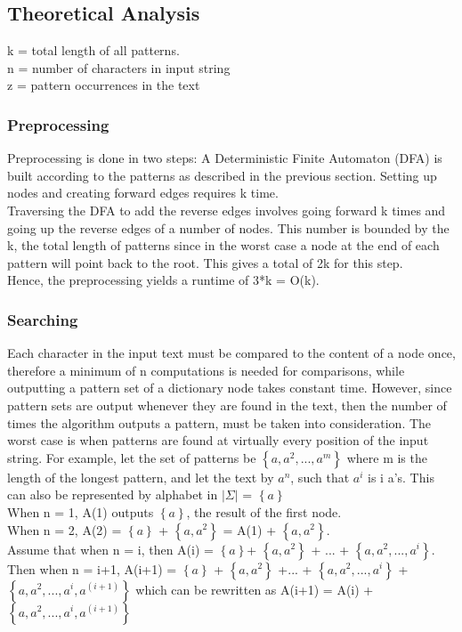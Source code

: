 \documentclass[paper=a4, fontsize=11pt]{scrartcl} %
\numberwithin{equation}{section} %
\numberwithin{figure}{section} %
\numberwithin{table}{section} %
\begin{document}
\subsection{Theoretical Analysis}
k = total length of all patterns.\\
n = number of characters in input string\\
z = pattern occurrences in the text

\subsubsection{Preprocessing}
Preprocessing is done in two steps:
A Deterministic Finite Automaton (DFA) is built according to the patterns as described in the previous section. Setting up nodes and creating forward edges requires k time.\\
Traversing the DFA to add the reverse edges involves going forward k times and going up the reverse edges of a number of nodes. This number is bounded by the k, the total length of patterns since in the worst case a node at the end of each pattern will point back to the root. This gives a total of 2k for this step. \\
Hence, the preprocessing yields a runtime of 3*k = O(k). 

\subsubsection{Searching}
Each character in the input text must be compared to the content of a node once, therefore a minimum of n computations is needed for comparisons, while outputting a pattern set of a dictionary node takes constant time. However, since pattern sets are output whenever they are found in the text, then the number of times the algorithm outputs a pattern, must be taken into consideration. The worst case is when patterns are found at virtually every position of the input string. For example, let the set of patterns be $\left\{a, a^2, ..., a^m\right\}$ where m is the length of the longest pattern, and let the text by $a^n$, such that $a^i$ is i a's. This can also be represented by alphabet in $|\Sigma|$ = $\left\{a\right\}$\\
 
When n = 1, A(1) outputs $\left\{a\right\}$, the result of the first node.\\
When n = 2, A(2) = $\left\{a\right\}$ + $\left\{a, a^2\right\}$ = A(1) + $\left\{a, a^2\right\}$.\\
Assume that when n = i, then A(i) =  $\left\{a\right\}$+ $\left\{a, a^2\right\}$ + ... + $\left\{a, a^2, ..., a^i\right\}$.\\
Then when n = i+1, A(i+1) = $\left\{a\right\}$ + $\left\{a, a^2\right\}$ +... + $\left\{a, a^2, ..., a^i\right\}$ + $\left\{a, a^2, ..., a^i, a^(i+1)\right\}$ which can be rewritten as 
A(i+1) = A(i) + $\left\{a, a^2, ..., a^i, a^(i+1)\right\}$ \\
\end{document}
